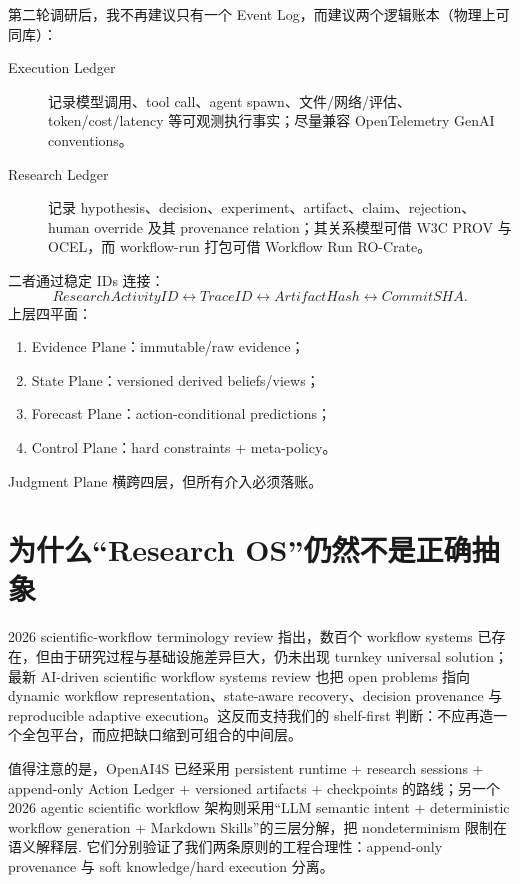 \documentclass[11pt,a4paper]{ctexart}
\begin{document}
第二轮调研后，我不再建议只有一个 Event Log，而建议两个逻辑账本（物理上可同库）：
\begin{description}
 \item[Execution Ledger] 记录模型调用、tool call、agent spawn、文件/网络/评估、token/cost/latency 等可观测执行事实；尽量兼容 OpenTelemetry GenAI conventions\cite{otel2026genai}。
 \item[Research Ledger] 记录 hypothesis、decision、experiment、artifact、claim、rejection、human override 及其 provenance relation；其关系模型可借 W3C PROV 与 OCEL，而 workflow-run 打包可借 Workflow Run RO-Crate\cite{w3cprov2013,ocel2023,soiland2024wfrun}。
\end{description}
二者通过稳定 IDs 连接：
\begin{equation}
ResearchActivityID\leftrightarrow TraceID\leftrightarrow ArtifactHash\leftrightarrow CommitSHA.
\end{equation}
上层四平面：
\begin{enumerate}
 \item Evidence Plane：immutable/raw evidence；
 \item State Plane：versioned derived beliefs/views；
 \item Forecast Plane：action-conditional predictions；
 \item Control Plane：hard constraints + meta-policy。
\end{enumerate}
Judgment Plane 横跨四层，但所有介入必须落账。

\section{为什么“Research OS”仍然不是正确抽象}

2026 scientific-workflow terminology review 指出，数百个 workflow systems 已存在，但由于研究过程与基础设施差异巨大，仍未出现 turnkey universal solution\cite{workflowterms2026}；最新 AI-driven scientific workflow systems review 也把 open problems 指向 dynamic workflow representation、state-aware recovery、decision provenance 与 reproducible adaptive execution\cite{alnasir2026workflows}。这反而支持我们的 shelf-first 判断：不应再造一个全包平台，而应把缺口缩到可组合的中间层。

值得注意的是，OpenAI4S 已经采用 persistent runtime + research sessions + append-only Action Ledger + versioned artifacts + checkpoints 的路线\cite{openai4s2026}；另一个 2026 agentic scientific workflow 架构则采用“LLM semantic intent + deterministic workflow generation + Markdown Skills”的三层分解，把 nondeterminism 限制在语义解释层\cite{balis2026workflow}. 它们分别验证了我们两条原则的工程合理性：append-only provenance 与 soft knowledge/hard execution 分离。
\end{document}
